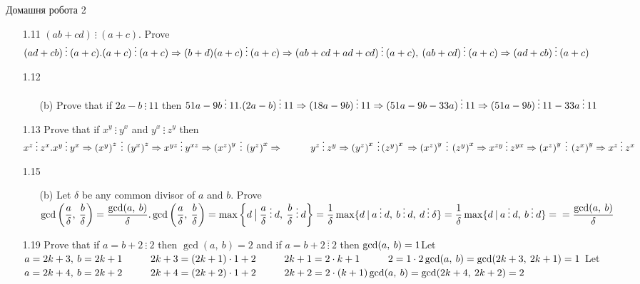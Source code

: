 \documentclass[a4paper,12pt]{article}
\newcommand\tab[1][1cm]{\hspace*{#1}}
\begin{document}
\begin{center}
{\LARGE Домашня робота 2}%
\end{center}
\begin{itemize}
	\item [1.11] $(ab+cd)\>\vdots\>(a+c).$ Prove $(ad+cb)\>\vdots\>(a+c).\\(a+c)\>\vdots\>(a+c)\Rightarrow (b+d)(a+c)\>\vdots\>(a+c)\Rightarrow (ab+cd+ad+cd)\>\vdots\>(a+c),\\\>(ab+cd)\>\vdots\>(a+c)\Rightarrow(ad+cb)\>\vdots\>(a+c)$
	\item [1.12] \begin{itemize} 
		\item [(b)] Prove that if $2a-b\>\vdots\>11$ then $51a-9b\>\vdots\>11.\\(2a-b)\>\vdots\>11\Rightarrow(18a-9b)\>\vdots\>11\Rightarrow(51a-9b-33a)\>\vdots\>11\Rightarrow(51a-9b)\>\vdots\>11-33a\>\vdots\>11$
	\end{itemize}
	\item [1.13] Prove that if $x^y\>\vdots\>y^x$ and $y^x\>\vdots\>z^y$ then $x^z\>\vdots\>z^x.\\x^y\>\vdots\>y^x\Rightarrow\left(x^y \right)^z\>\vdots\>\left(y^x \right)^z\Rightarrow x^{yz}\>\vdots\>y^{xz}\Rightarrow\left(x^z \right)^y\>\vdots\>\left(y^z \right)^x\Rightarrow\\\tab y^z\>\vdots\>z^y\Rightarrow \left(y^z \right)^x\>\vdots \left(z^y \right)^x\\\Rightarrow\left(x^z \right)^y\>\vdots\>\left(z^y \right)^x\Rightarrow x^{zy}\>\vdots\>z^{yx}\Rightarrow \left(x^z \right)^y\>\vdots\>\left(z^x \right)^y\Rightarrow x^z\>\vdots\>z^x$
	\item [1.15] \begin{itemize} 
		\item [(b)] Let $\delta$ be any common divisor of $a$ and $b$. Prove $\gcd\left(\dfrac{a}{\delta},\>\dfrac{b}{\delta} \right)=\dfrac{\gcd(a,\>b)}{\delta}. \\\gcd\left(\dfrac{a}{\delta},\>\dfrac{b}{\delta} \right)=\max\left\{d\>\big|\>\dfrac{a}{\delta}\>\vdots\>d,\>\dfrac{b}{\delta}\>\vdots\>d\right\}=\dfrac{1}{\delta}\max\{d\>|\>a\>\vdots\>d,\>b\>\vdots\>d,\>d\>\vdots\>\delta\}=\dfrac{1}{\delta}\max\{d\>|\>a\>\vdots\>d,\>b\>\vdots\>d\}=\\=\dfrac{\gcd(a,\>b)}{\delta}$
	\end{itemize}
	\item [1.19] Prove that if $a=b+2\>\vdots\>2$ then $\gcd(a,\>b)=2$ and if $a=b+2\overline{\>\vdots\>}2$ then $\gcd(a,\>b)=1\\$Let $a=2k+3,\>b=2k+1\\\tab2k+3=(2k+1)\cdot1+2\\\tab2k+1=2\cdot k+1\\\tab 2=1\cdot 2\\\gcd(a,\>b)=\gcd(2k+3,\>2k+1)=1\\$ Let $a=2k+4,\>b=2k+2\\\tab 2k+4=(2k+2)\cdot1+2\\\tab 2k+2=2\cdot(k+1)\\\gcd(a,\>b)=\gcd(2k+4,\>2k+2)=2$

\end{itemize}
\end{document}
